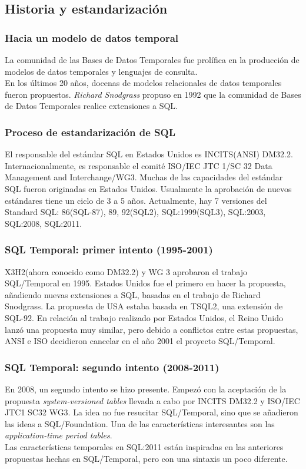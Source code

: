 \documentclass[a4paper,12pt,oneside]{report}
\begin{document}
\subsection*{Historia y estandarizaci\'on}
\subsubsection*{Hacia un modelo de datos temporal}
La comunidad de las Bases de Datos Temporales fue prol\'ifica en la producci\'on de modelos de datos temporales y lenguajes de consulta.\\
En los \'ultimos 20 a\~nos, docenas de modelos relacionales de datos temporales fueron propuestos. \textit{Richard Snodgrass} propuso en 1992 que la comunidad de Bases de Datos Temporales realice extensiones a SQL.
\subsubsection*{Proceso de estandarizaci\'on de SQL}
El responsable del est\'andar SQL en Estados Unidos es INCITS(ANSI) DM32.2. Internacionalmente, es responsable el comit\'e ISO/IEC JTC 1/SC 32 Data Management and Interchange/WG3. Muchas de las capacidades del est\'andar SQL fueron originadas en Estados Unidos. Usualmente la aprobaci\'on de nuevos est\'andares tiene un ciclo de 3 a 5 a\~nos. Actualmente, hay 7 versiones del Standard SQL: 86(SQL-87), 89, 92(SQL2), SQL:1999(SQL3), SQL:2003, SQL:2008, SQL:2011.
\subsubsection*{SQL Temporal: primer intento (1995-2001)}
X3H2(ahora conocido como DM32.2) y WG 3 aprobaron el trabajo SQL/Temporal en 1995. Estados Unidos fue el primero en hacer la propuesta, a\~nadiendo nuevas extensiones a SQL, basadas en el trabajo de Richard Snodgrass. La propuesta de USA estaba basada en TSQL2, una extensi\'on de SQL-92. En relaci\'on al trabajo realizado por Estados Unidos, el Reino Unido lanz\'o una propuesta muy similar, pero debido a conflictos entre estas propuestas, ANSI e ISO decidieron cancelar en el a\~no 2001 el proyecto SQL/Temporal.
\subsubsection*{SQL Temporal: segundo intento (2008-2011)}
En 2008, un segundo intento se hizo presente. Empez\'o con la aceptaci\'on de la propuesta \textit{system-versioned tables} llevada a cabo por INCITS DM32.2 y ISO/IEC JTC1 SC32 WG3. La idea no fue resucitar SQL/Temporal, sino que se a\~nadieron las ideas a SQL/Foundation. Una de las caracter\'isticas interesantes son las \textit{application-time period tables}.\\
Las caracter\'isticas temporales en SQL:2011 est\'an inspiradas en las anteriores propuestas hechas en SQL/Temporal, pero con una sintaxis un poco diferente.
\end{document}
